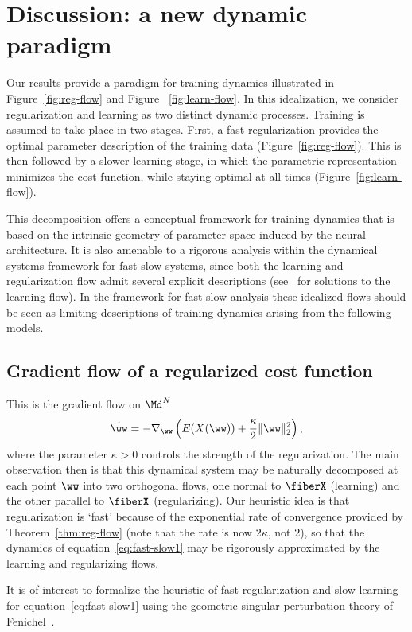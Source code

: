 \section{Discussion: a new dynamic paradigm}
Our results provide a paradigm for training dynamics illustrated in Figure~\ref{fig:reg-flow} and Figure ~\ref{fig:learn-flow}. In this idealization, we consider regularization and learning as two distinct dynamic processes. Training is assumed to take place in two stages. First, a fast regularization provides the optimal parameter description of the training data (Figure~\ref{fig:reg-flow}). This is then followed by a slower learning stage, in which the parametric representation minimizes the cost function, while staying optimal at all times (Figure~\ref{fig:learn-flow}). 

This decomposition offers a conceptual framework for training dynamics that is based on the intrinsic geometry of parameter space induced by the neural architecture. It is also amenable to a rigorous analysis within the dynamical systems framework for fast-slow systems, since both the learning and regularization flow admit several explicit descriptions (see~\cite{Chen2} for solutions to the learning flow). In the framework for fast-slow analysis these idealized flows should be seen as limiting descriptions of training dynamics arising from the following models. 

\subsection{Gradient flow of a regularized cost function}
This is the gradient flow on $\Md^N$
\begin{equation}
    \label{eq:fast-slow1}
    \dot{\ww} = -\nabla_\ww \left( E(X(\ww)) + \frac{\kappa}{2} \|\ww\|_2^2\right),
\end{equation}
where the parameter $\kappa>0$ controls the strength of the regularization. The main observation then is that this dynamical system may be naturally decomposed  at each point $\ww$ into two orthogonal flows, one normal to $\fiberX$ (learning) and the other parallel to $\fiberX$ (regularizing). Our heuristic idea is that regularization is `fast' because of the exponential rate of convergence provided by Theorem~\ref{thm:reg-flow} (note that the rate is now $2\kappa$, not $2$), so that the dynamics of equation~\eqref{eq:fast-slow1} may be rigorously approximated by the learning and regularizing flows.

It is of interest to formalize the heuristic of fast-regularization and slow-learning for equation~\eqref{eq:fast-slow1} using the geometric singular perturbation theory of Fenichel~\cite{Fenichel}. 

